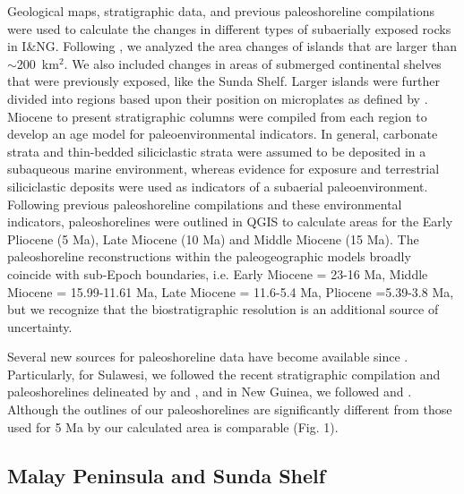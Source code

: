 \documentclass[11pt,letterpaper]{article}
\begin{document}
Geological maps, stratigraphic data, and previous paleoshoreline compilations were used to calculate the changes in different types of subaerially exposed rocks in I\&NG. Following \citet{Molnar2015a}, we analyzed the area changes of islands that are larger than $\sim$200~km$^{2}$. We also included changes in areas of submerged continental shelves that were previously exposed, like the Sunda Shelf. Larger islands were further divided into regions based upon their position on microplates as defined by \citep{Matthews2016a}. Miocene to present stratigraphic columns were compiled from each region to develop an age model for paleoenvironmental indicators. In general, carbonate strata and thin-bedded siliciclastic strata were assumed to be deposited in a subaqueous marine environment, whereas evidence for exposure and terrestrial siliciclastic deposits were used as indicators of a subaerial paleoenvironment. Following previous paleoshoreline compilations and these environmental indicators, paleoshorelines were outlined in QGIS to calculate areas for the Early Pliocene (5 Ma), Late Miocene (10 Ma) and Middle Miocene (15 Ma). The paleoshoreline reconstructions within the paleogeographic models broadly coincide with sub-Epoch boundaries, i.e. Early Miocene = 23-16 Ma, Middle Miocene = 15.99-11.61 Ma, Late Miocene = 11.6-5.4 Ma, Pliocene =5.39-3.8 Ma, but we recognize that the biostratigraphic resolution is an additional source of uncertainty.

Several new sources for paleoshoreline data have become available since \citet{Molnar2015a}. Particularly, for Sulawesi, we followed the recent stratigraphic compilation and paleoshorelines delineated by \citet{Nugraha2018a} and \citet{Hall2018a}, and in New Guinea, we followed \citet{Gold2017a} and \cite{Harrington2017a}. Although the outlines of our paleoshorelines are significantly different from those used for 5 Ma by \citet{Molnar2015a} our calculated area is comparable (Fig. 1). 

\subsection*{Malay Peninsula and Sunda Shelf}
\end{document}
